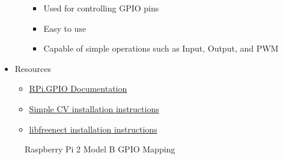 \documentclass[12pt]{article}
\begin{document}
\begin{description}
\begin{itemize}
\begin{itemize}
						\begin{itemize}
							\item Used for controlling GPIO pins
							\item Easy to use
							\item Capable of simple operations such as Input, Output, and PWM
						\end{itemize}
				\end{itemize}
			\item Resources
				\begin{itemize}
					\item \href{http://sourceforge.net/p/raspberry-gpio-python/wiki/}{RPi.GPIO Documentation}
					\item \href{https://github.com/sightmachine/SimpleCV/blob/develop/doc/HOWTO-Install\%20on\%20RaspberryPi.rst}{Simple CV installation instructions}
					\item \href{http://openkinect.org/wiki/Getting_Started}{libfreenect installation instructions}
				\end{itemize}
		\end{itemize}
		\begin{figure}[H]
			\centering
			\caption{Raspberry Pi 2 Model B GPIO Mapping}
		\end{figure}
\end{description}
\end{document}
